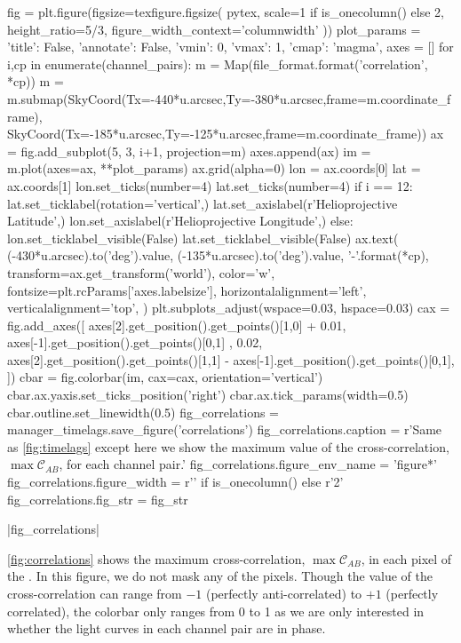 \begin{pycode}
fig = plt.figure(figsize=texfigure.figsize(
    pytex,
    scale=1 if is_onecolumn() else 2,
    height_ratio=5/3,
    figure_width_context='columnwidth'
))
plot_params = {
    'title': False, 
    'annotate': False,
    'vmin': 0,
    'vmax': 1,
    'cmap': 'magma',
}
axes = []
for i,cp in enumerate(channel_pairs):
    m = Map(file_format.format('correlation', *cp))
    m = m.submap(SkyCoord(Tx=-440*u.arcsec,Ty=-380*u.arcsec,frame=m.coordinate_frame),
                 SkyCoord(Tx=-185*u.arcsec,Ty=-125*u.arcsec,frame=m.coordinate_frame))
    ax = fig.add_subplot(5, 3, i+1, projection=m)
    axes.append(ax)
    im = m.plot(axes=ax, **plot_params)
    ax.grid(alpha=0)
    lon = ax.coords[0]
    lat = ax.coords[1]
    lon.set_ticks(number=4)
    lat.set_ticks(number=4) 
    if i == 12:
        lat.set_ticklabel(rotation='vertical',)
        lat.set_axislabel(r'Helioprojective Latitude',)
        lon.set_axislabel(r'Helioprojective Longitude',)
    else:
        lon.set_ticklabel_visible(False)
        lat.set_ticklabel_visible(False)
    ax.text(
        (-430*u.arcsec).to('deg').value,
        (-135*u.arcsec).to('deg').value,
        '{}-{}'.format(*cp),
        transform=ax.get_transform('world'),
        color='w',
        fontsize=plt.rcParams['axes.labelsize'],
        horizontalalignment='left',
        verticalalignment='top',
    )
plt.subplots_adjust(wspace=0.03, hspace=0.03)
cax = fig.add_axes([
    axes[2].get_position().get_points()[1,0] + 0.01,
    axes[-1].get_position().get_points()[0,1] ,
    0.02,
    axes[2].get_position().get_points()[1,1] - axes[-1].get_position().get_points()[0,1], 
])
cbar = fig.colorbar(im, cax=cax, orientation='vertical')
cbar.ax.yaxis.set_ticks_position('right')
cbar.ax.tick_params(width=0.5)
cbar.outline.set_linewidth(0.5)
fig_correlations = manager_timelags.save_figure('correlations')
fig_correlations.caption = r'Same as \autoref{fig:timelags} except here we show the maximum value of the cross-correlation, $\max\mathcal{C}_{AB}$, for each channel pair.'
fig_correlations.figure_env_name = 'figure*'
fig_correlations.figure_width = r'\columnwidth' if is_onecolumn() else r'2\columnwidth'
fig_correlations.fig_str = fig_str
\end{pycode}
|fig_correlations|

\autoref{fig:correlations} shows the maximum cross-correlation, $\max\mathcal{C}_{AB}$, in each pixel of the \AR{}.
In this figure, we do not mask any of the pixels. Though the value of the cross-correlation can range from $-1$ (perfectly anti-correlated) to $+1$ (perfectly correlated), the colorbar only ranges from 0 to 1 as we are only interested in whether the light curves in each channel pair are in phase.

